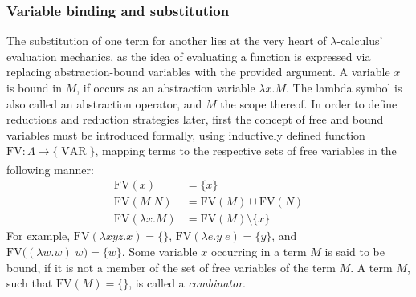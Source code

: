 \documentclass[table, a4paper, 10pt]{article}
\newcommand{\cit}[1]{\textsuperscript{\cite{#1}}}
\begin{document}
\subsubsection{Variable binding and substitution}\label{sec:subst}
The substitution of one term for another lies at the very heart of $\lambda$-calculus'
evaluation mechanics, as the idea of evaluating a function is expressed via replacing
abstraction-bound variables with the provided argument. A variable $x$ is bound in $M$,
if occurs as an abstraction variable $\lambda x.M$. The lambda symbol is also called
an abstraction operator, and $M$ the scope thereof. In order to define
reductions and reduction strategies later, first the concept of free
and bound variables must be introduced formally, using inductively defined
function $\mathrm{FV} : \Lambda \to \big\{\mathrm{\;VAR\;}\big\}$, mapping 
terms to the respective sets of free variables in the following manner:\cit{zlatuska}
\begin{align*}
	\mathrm{FV}(x) &= \{x\} \\
    \mathrm{FV}(M\;N) &= \mathrm{FV}(M) \cup \mathrm{FV}(N)\\
	\mathrm{FV}(\lambda x.M) &= \mathrm{FV}(M) \setminus \{x\}
\end{align*}
For example, $\mathrm{FV}(\lambda x y z.x) = \{\}$, $\mathrm{FV}(\lambda e.y\;e) = \{y\}$,
and $\mathrm{FV}\big((\lambda w.w)\;w\big) = \{w\}$. Some variable $x$ occurring in a term $M$ is
said to be bound, if it is not a member of the set of free variables of the term $M$.
A term $M$, such that $\mathrm{FV}(M) = \{\}$, is called a \textit{combinator}.
\end{document}
